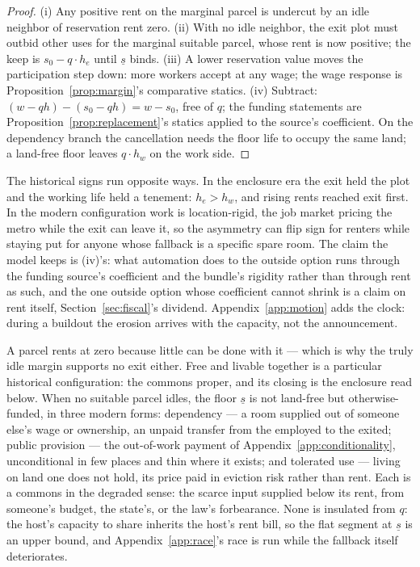 \documentclass[12pt]{article}
\theoremstyle{plain}
\begin{document}
\begin{proof}
(i) Any positive rent on the marginal parcel is undercut by an idle neighbor of reservation rent zero. (ii) With no idle neighbor, the exit plot must outbid other uses for the marginal suitable parcel, whose rent is now positive; the keep is $s_0 - q\cdot h_e$ until $\underline{s}$ binds. (iii) A lower reservation value moves the participation step down: more workers accept at any wage; the wage response is Proposition~\ref{prop:margin}'s comparative statics. (iv) Subtract: $(w - qh) - (s_0 - qh) = w - s_0$, free of $q$; the funding statements are Proposition~\ref{prop:replacement}'s statics applied to the source's coefficient. On the dependency branch the cancellation needs the floor life to occupy the same land; a land-free floor leaves $q\cdot h_w$ on the work side.
\end{proof}

The historical signs run opposite ways. In the enclosure era the exit held the plot and the working life held a tenement: $h_e > h_w$, and rising rents reached exit first. In the modern configuration work is location-rigid, the job market pricing the metro while the exit can leave it, so the asymmetry can flip sign for renters while staying put for anyone whose fallback is a specific spare room. The claim the model keeps is (iv)'s: what automation does to the outside option runs through the funding source's coefficient and the bundle's rigidity rather than through rent as such, and the one outside option whose coefficient cannot shrink is a claim on rent itself, Section~\ref{sec:fiscal}'s dividend. Appendix~\ref{app:motion} adds the clock: during a buildout the erosion arrives with the capacity, not the announcement.

A parcel rents at zero because little can be done with it --- which is why the truly idle margin supports no exit either. Free and livable together is a particular historical configuration: the commons proper, and its closing is the enclosure read below. When no suitable parcel idles, the floor $\underline{s}$ is not land-free but otherwise-funded, in three modern forms: dependency --- a room supplied out of someone else's wage or ownership, an unpaid transfer from the employed to the exited; public provision --- the out-of-work payment of Appendix~\ref{app:conditionality}, unconditional in few places and thin where it exists; and tolerated use --- living on land one does not hold, its price paid in eviction risk rather than rent. Each is a commons in the degraded sense: the scarce input supplied below its rent, from someone's budget, the state's, or the law's forbearance. None is insulated from $q$: the host's capacity to share inherits the host's rent bill, so the flat segment at $\underline{s}$ is an upper bound, and Appendix~\ref{app:race}'s race is run while the fallback itself deteriorates.
\end{document}
